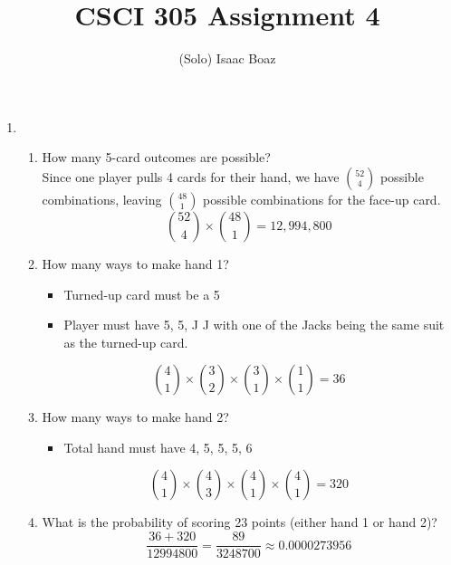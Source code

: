 \documentclass{article}
\title{\vspace{-2.5em}CSCI 305 Assignment 4}
\author{(Solo) Isaac Boaz}
\begin{document}
\maketitle

\begin{enumerate}
    \item \begin{enumerate}[label=\arabic*.]
              \item How many 5-card outcomes are possible? \\
                    Since one player pulls 4 cards for their hand, we have ${52 \choose 4}$ possible combinations, leaving ${48 \choose 1}$ possible combinations for the face-up card.
                    \begin{equation*}
                        {52 \choose 4} \times {48 \choose 1} = 12,994,800
                    \end{equation*}
              \item How many ways to make hand 1?
                    \begin{itemize}
                        \item Turned-up card must be a 5
                        \item Player must have 5, 5, J J with one of the Jacks being the same suit as the turned-up card.
                    \end{itemize}
                    \begin{equation*}
                        {4 \choose 1} \times {3 \choose 2} \times {3 \choose 1} \times {1 \choose 1} = 36
                    \end{equation*}
              \item How many ways to make hand 2?
                    \begin{itemize}
                        \item Total hand must have 4, 5, 5, 5, 6
                    \end{itemize}
                    \begin{equation*}
                        {4 \choose 1} \times {4 \choose 3} \times {4 \choose 1} \times {4 \choose 1} = 320
                    \end{equation*}
              \item What is the probability of scoring 23 points (either hand 1 or hand 2)?
                    \begin{equation*}
                        \frac{36 + 320}{\num{12994800}} = \frac{89}{\num{3248700}} \approx 0.0000273956

\end{equation*}
\end{enumerate}
\end{enumerate}
\end{document}
